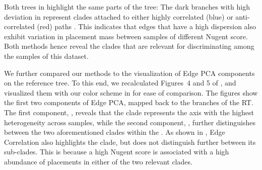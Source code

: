Both trees in  highlight the same parts of the tree:
The dark branches with high deviation in  represent clades
attached to either highly correlated (blue) or anti-correlated (red) paths .
This indicates that edges that have a high dispersion
also exhibit variation in placement mass between samples of different Nugent score.
Both methods hence reveal the clades that are relevant for discriminating among the samples of this dataset.

We further compared our methods to the visualization of Edge PCA components on the reference tree.
To this end, we recalculated Figures~4 and 5 of ,
and visualized them with our color scheme in  for ease of comparison.
The figures show the first two components of Edge PCA, mapped back to the branches of the \ac{RT}.
The first component, ,
reveals that the  clade represents the axis with the highest heterogeneity across samples,
while the second component, ,
further distinguishes between the two aforementioned clades within the .
As shown in , Edge Correlation also highlights the  clade,
but does not distinguish further between its sub-clades.
This is because a high Nugent score is associated
with a high abundance of placements in either of the two relevant  clades.


